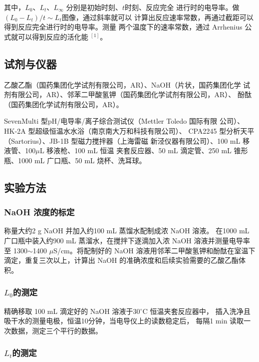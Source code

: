 \documentclass[12pt]{ctexart}
\numberwithin{equation}{section}
\begin{document}
其中，$L_0$、$L_t$、$L_\infty$ 分别是初始时刻、$t$时刻、反应完全
进行时的电导率。做$(L_0 - L_t)/t \sim L_t$图像，通过斜率就可以
计算出反应速率常数，再通过截距可以得到反应完全进行时的电导率。测量
两个温度下的速率常数，通过 Arrhenius 公式就可以得到反应的活化能
$^{[1]}$。

\subsection{试剂与仪器}

乙酸乙酯（国药集团化学试剂有限公司，AR）、NaOH（片状，国药集团化学
试剂有限公司，AR）、邻苯二甲酸氢钾（国药集团化学试剂有限公司，AR）、
酚酞（国药集团化学试剂有限公司，AR）。

SevenMulti 型pH/电导率/离子综合测试仪（Mettler Toledo 国际有限
公司）、HK-2A 型超级恒温水水浴（南京南大万和科技有限公司）、
CPA2245 型分析天平（Sartorius）、JB-1B 型磁力搅拌器（上海雷磁
新泾仪器有限公司）、100 mL 移液管、100$\mu$L 移液枪、100 mL 恒温
夹套反应器、50 mL 滴定管、250 mL 锥形瓶、1000 mL 广口瓶、50 mL
烧杯、洗耳球。

\subsection{实验方法}
\subsubsection{NaOH 浓度的标定}

称量大约2 g NaOH 并加入约100 mL 蒸馏水配制成浓 NaOH 溶液。
在1000 mL 广口瓶中装入约900 mL 蒸溜水，在搅拌下逐滴加入浓 NaOH
溶液并测量电导率至 1300$\sim$1400 $\mu$S/cm。将配制好的 NaOH
溶液用邻苯二甲酸氢钾和酚酞在室温下滴定，重复三次以上，计算出 NaOH
的准确浓度和后续实验需要的乙酸乙酯体积。

\subsubsection{\texorpdfstring{$L_0$的测定}{L0 的测定}}

精确移取 100 mL 滴定好的 NaOH 溶液于30$^\circ$C 恒温夹套反应器中，
插入洗净且吸干水的测量电极，恒温10分钟，当电导仪上的读数稳定后，
每隔1 min 读取一次数据，测定三个平行的数据。

\subsubsection{\texorpdfstring{$L_t$的测定}{Lt 的测定}}
\end{document}
